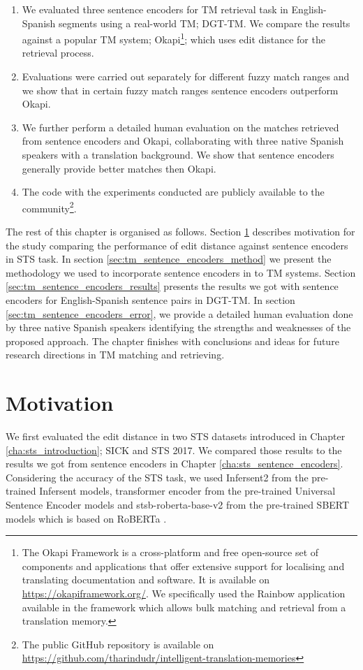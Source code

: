 \begin{enumerate}
	\item We evaluated three sentence encoders for TM retrieval task in English-Spanish segments using a real-world TM; DGT-TM. We compare the results against a popular TM system; Okapi\footnote{The Okapi Framework is a cross-platform and free open-source set of components and applications that offer extensive support for localising and translating documentation and software. It is available on \url{https://okapiframework.org/}. We specifically used the Rainbow application available in the framework which allows bulk matching and retrieval from a translation memory.}; which uses edit distance for the retrieval process.
	
	\item Evaluations were carried out separately for different fuzzy match ranges and we show that in certain fuzzy match ranges sentence encoders outperform Okapi.
	
	\item We further perform a detailed human evaluation on the matches retrieved from sentence encoders and Okapi, collaborating with three native Spanish speakers with a translation background. We show that sentence encoders generally provide better matches then Okapi.
	
	\item The code with the experiments conducted are publicly available to the community\footnote{The public GitHub repository is available on \url{https://github.com/tharindudr/intelligent-translation-memories}}.
\end{enumerate}

The rest of this chapter is organised as follows. Section \ref{sec:tm_sentence_encoders_motivation} describes motivation for the study comparing the performance of edit distance against sentence encoders in STS task. In section \ref{sec:tm_sentence_encoders_method} we present the methodology we used to incorporate sentence encoders in to TM systems. Section \ref{sec:tm_sentence_encoders_results} presents the results we got with sentence encoders for English-Spanish sentence pairs in DGT-TM. In section \ref{sec:tm_sentence_encoders_error}, we provide a detailed human evaluation done by three native Spanish speakers identifying the strengths and weaknesses of the proposed approach. The chapter finishes with conclusions and ideas for future research directions in TM matching and retrieving.


\section{Motivation}
\label{sec:tm_sentence_encoders_motivation}
We first evaluated the edit distance in two STS datasets introduced in Chapter \ref{cha:sts_introduction}; SICK and STS 2017. We compared those results to the results we got from sentence encoders in Chapter \ref{cha:sts_sentence_encoders}. Considering the accuracy of the STS task, we used Infersent2 from the pre-trained Infersent models, transformer encoder from the pre-trained Universal Sentence Encoder models and stsb-roberta-base-v2 from the pre-trained SBERT models which is based on RoBERTa \autocite{liu2019roberta}. 

